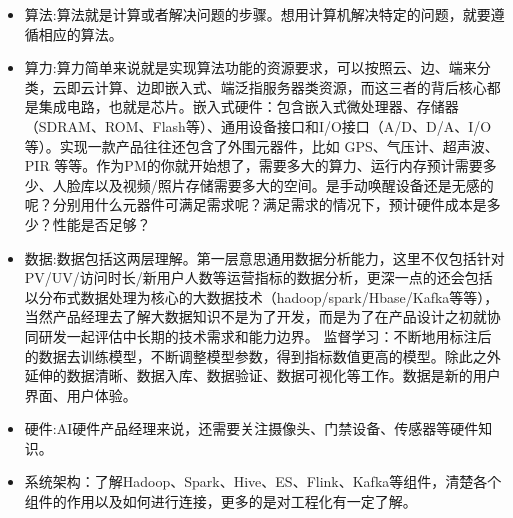 \documentclass[letterpaper,11pt,english]{sphinxmanual}
\begin{document}
%
\begin{footnote}[233]\sphinxAtStartFootnote
{}
%
\end{footnote}
\begin{itemize}
\item {} 
算法:算法就是计算或者解决问题的步骤。想用计算机解决特定的问题，就要遵循相应的算法。

\item {} 
算力:算力简单来说就是实现算法功能的资源要求，可以按照云、边、端来分类，云即云计算、边即嵌入式、端泛指服务器类资源，而这三者的背后核心都是集成电路，也就是芯片。嵌入式硬件：包含嵌入式微处理器、存储器（SDRAM、ROM、Flash等）、通用设备接口和I/O接口（A/D、D/A、I/O等）。实现一款产品往往还包含了外围元器件，比如
GPS、气压计、超声波、PIR
等等。作为PM的你就开始想了，需要多大的算力、运行内存预计需要多少、人脸库以及视频/照片存储需要多大的空间。是手动唤醒设备还是无感的呢？分别用什么元器件可满足需求呢？满足需求的情况下，预计硬件成本是多少？性能是否足够？

\item {} 
数据:数据包括这两层理解。第一层意思通用数据分析能力，这里不仅包括针对PV/UV/访问时长/新用户人数等运营指标的数据分析，更深一点的还会包括以分布式数据处理为核心的大数据技术（hadoop/spark/Hbase/Kafka等等），当然产品经理去了解大数据知识不是为了开发，而是为了在产品设计之初就协同研发一起评估中长期的技术需求和能力边界。
监督学习：不断地用标注后的数据去训练模型，不断调整模型参数，得到指标数值更高的模型。除此之外延伸的数据清晰、数据入库、数据验证、数据可视化等工作。数据是新的用户界面、用户体验。%
\begin{footnote}[234]\sphinxAtStartFootnote
{}
%
\end{footnote}

\item {} 
硬件:AI硬件产品经理来说，还需要关注摄像头、门禁设备、传感器等硬件知识。

\item {} 
系统架构：了解Hadoop、Spark、Hive、ES、Flink、Kafka等组件，清楚各个组件的作用以及如何进行连接，更多的是对工程化有一定了解。%
\begin{footnote}[235]\sphinxAtStartFootnote
{}
%
\end{footnote}

\end{itemize}
\end{document}
